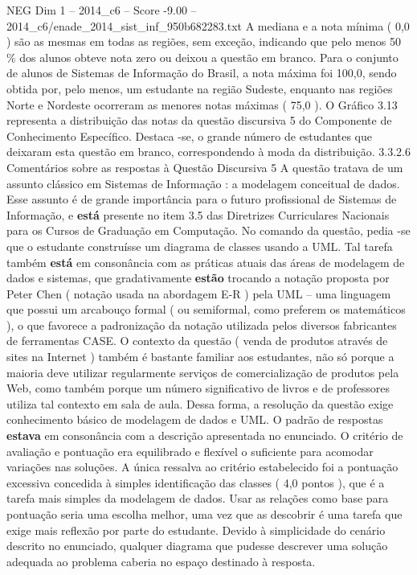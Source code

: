 \begin{textsample}{NEG Dim 1 – 2014\_c6 – Score -9.00 – 2014\_c6/enade\_2014\_sist\_inf\_950b682283.txt}
A mediana e a nota mínima ( 0,0 ) são as mesmas em todas as regiões, sem exceção, indicando que pelo menos 50 \% dos alunos obteve nota zero ou deixou a questão em branco.
Para o conjunto de alunos de Sistemas de Informação do Brasil, a nota máxima foi 100,0, sendo obtida por, pelo menos, um estudante na região Sudeste, enquanto nas regiões Norte e Nordeste ocorreram as menores notas máximas ( 75,0 ).
O Gráfico 3.13 representa a distribuição das notas da questão discursiva 5 do Componente de Conhecimento Específico.
Destaca -se, o grande número de estudantes que deixaram esta questão em branco, correspondendo à moda da distribuição. 3.3.2.6 Comentários sobre as respostas à Questão Discursiva 5 A questão tratava de um assunto clássico em Sistemas de Informação : a modelagem conceitual de dados.
Esse assunto é de grande importância para o futuro profissional de Sistemas de Informação, e \textbf{está} presente no item 3.5 das Diretrizes Curriculares Nacionais para os Cursos de Graduação em Computação.
No comando da questão, pedia -se que o estudante construísse um diagrama de classes usando a UML.
Tal tarefa também \textbf{está} em consonância com as práticas atuais das áreas de modelagem de dados e sistemas, que gradativamente \textbf{estão} trocando a notação proposta por Peter Chen ( notação usada na abordagem E-R ) pela UML – uma linguagem que possui um arcabouço formal ( ou semiformal, como preferem os matemáticos ), o que favorece a padronização da notação utilizada pelos diversos fabricantes de ferramentas CASE.
O contexto da questão ( venda de produtos através de sites na Internet ) também é bastante familiar aos estudantes, não só porque a maioria deve utilizar regularmente serviços de comercialização de produtos pela Web, como também porque um número significativo de livros e de professores utiliza tal contexto em sala de aula.
Dessa forma, a resolução da questão exige conhecimento básico de modelagem de dados e UML.
O padrão de respostas \textbf{estava} em consonância com a descrição apresentada no enunciado.
O critério de avaliação e pontuação era equilibrado e flexível o suficiente para acomodar variações nas soluções.
A única ressalva ao critério estabelecido foi a pontuação excessiva concedida à simples identificação das classes ( 4,0 pontos ), que é a tarefa mais simples da modelagem de dados.
Usar as relações como base para pontuação seria uma escolha melhor, uma vez que as descobrir é uma tarefa que exige mais reflexão por parte do estudante.
Devido à simplicidade do cenário descrito no enunciado, qualquer diagrama que pudesse descrever uma solução adequada ao problema caberia no espaço destinado à resposta.

\end{textsample}
